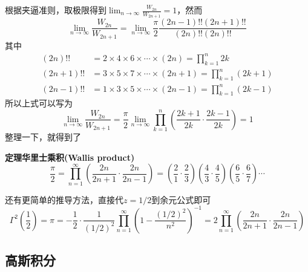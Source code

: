 \documentclass[UTF8]{ctexart}
\newenvironment{theorem}[1]
    {\begin{tcolorbox}[enhanced, colback=LightYellow, breakable=true, frame hidden, borderline west={1.5mm}{-2mm}{DarkBlue}]
    {\bfseries {\color{DarkBlue} 定理}\quad #1} \newline}
    {\end{tcolorbox}}
\begin{document}
根据夹逼准则，取极限得到\(\displaystyle{\lim_{n \to \infty} \frac{W_{2n}}{W_{2n+1}} = 1 }\)，然而
\[\lim_{n \to \infty} \frac{W_{2n}}{W_{2n+1}} = \lim_{n \to \infty} \frac{\pi}{2} \frac{(2n-1)!!(2n+1)!!}{(2n)!!(2n)!!}\]
其中
\begin{align*}
    (2n)!! &= 2 \times 4 \times 6 \times \cdots \times (2n) = \prod_{k=1}^{n} 2k \\
    (2n+1)!! &= 3 \times 5 \times 7 \times \cdots \times (2n+1) = \prod_{k=1}^{n} (2k+1) \\
    (2n-1)!! &= 1 \times 3 \times 5 \times \cdots \times (2n-1) = \prod_{k=1}^{n} (2k-1)
\end{align*}
所以上式可以写为
\[\lim_{n \to \infty} \frac{W_{2n}}{W_{2n+1}} = \frac{\pi}{2} \lim_{n \to \infty}  \prod_{k=1}^{n} \left(\frac{2k+1}{2k}\cdot\frac{2k-1}{2k}\right) = 1\]
整理一下，就得到了
\begin{theorem}{华里士乘积(Wallis product)}
    \[\frac{\pi}{2} = \prod_{n=1}^{\infty} \left(\frac{2n}{2n+1}\cdot\frac{2n}{2n-1}\right) = \left(\frac{2}{1}\cdot\frac{2}{3}\right)\left(\frac{4}{3}\cdot\frac{4}{5}\right)\left(\frac{6}{5}\cdot\frac{6}{7}\right)\cdots\]
\end{theorem}

还有更简单的推导方法，直接代\(z=1/2\)到余元公式即可
\[\Gamma^2\left(\frac{1}{2}\right) = \pi = -\frac{1}{2}\cdot\frac{1}{(1/2)^2}\prod_{n=1}^{\infty}\left(1-\frac{(1/2)^2}{n^2}\right)^{-1} = 2\prod_{n=1}^{\infty}\left(\frac{2n}{2n+1}\cdot\frac{2n}{2n-1}\right)\]

\subsection{高斯积分}
\end{document}
